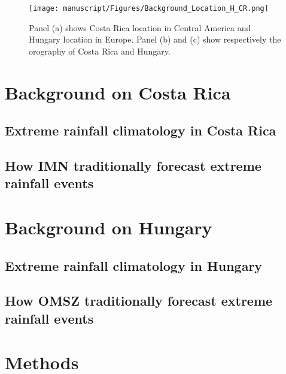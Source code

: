 \documentclass[twocol]{ametsocV5} %
\begin{document}

\begin{figure}
\centerline{\texttt{[image: manuscript/Figures/Background\_Location\_H\_CR.png]}}
\caption{Panel (a) shows Costa Rica location in Central America and Hungary location in Europe. Panel (b) and (c) show respectively the orography of Costa Rica and Hungary.}
\label{GeoLocation_H_CR}
\end{figure}

\section{Background on Costa Rica}
\subsection{Extreme rainfall climatology in Costa Rica}
\subsection{How IMN traditionally forecast extreme rainfall events}

\section{Background on Hungary}
\subsection{Extreme rainfall climatology in Hungary}
\subsection{How OMSZ traditionally forecast extreme rainfall events}




\section{Methods} 
\end{document}
